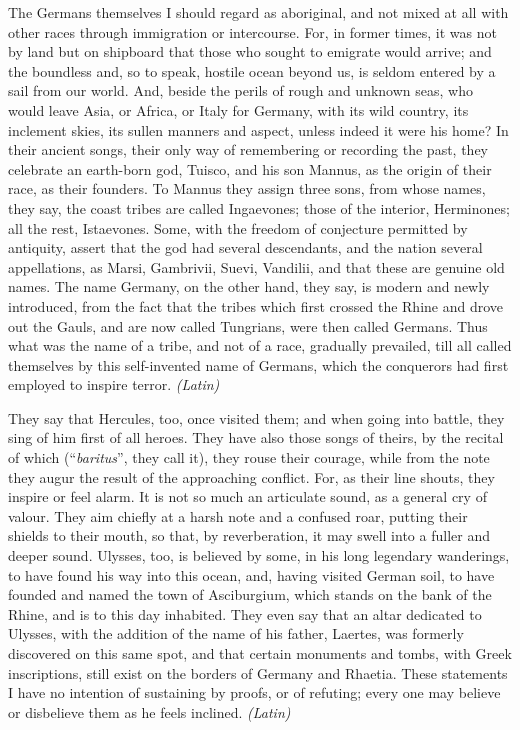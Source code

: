 The Germans themselves I should regard as aboriginal, and not mixed at all with other races through immigration or intercourse. For, in former times, it was not by land but on shipboard that those who sought to emigrate would arrive; and the boundless and, so to speak, hostile ocean beyond us, is seldom entered by a sail from our world. And, beside the perils of rough and unknown seas, who would leave Asia, or Africa, or Italy for Germany, with its wild country, its inclement skies, its sullen manners and aspect, unless indeed it were his home? In their ancient songs, their only way of remembering or recording the past, they celebrate an earth-born god, Tuisco, and his son Mannus, as the origin of their race, as their founders. To Mannus they assign three sons, from whose names, they say, the coast tribes are called Ingaevones; those of the interior, Herminones; all the rest, Istaevones. Some, with the freedom of conjecture permitted by antiquity, assert that the god had several descendants, and the nation several appellations, as Marsi, Gambrivii, Suevi, Vandilii, and that these are genuine old names. The name Germany, on the other hand, they say, is modern and newly introduced, from the fact that the tribes which first crossed the Rhine and drove out the Gauls, and are now called Tungrians, were then called Germans. Thus what was the name of a tribe, and not of a race, gradually prevailed, till all called themselves by this self-invented name of Germans, which the conquerors had first employed to inspire terror. \emph{(Latin)}


They say that Hercules, too, once visited them; and when going into battle, they sing of him first of all heroes. They have also those songs of theirs, by the recital of which (``\emph{baritus}'', they call it), they rouse their courage, while from the note they augur the result of the approaching conflict. For, as their line shouts, they inspire or feel alarm. It is not so much an articulate sound, as a general cry of valour. They aim chiefly at a harsh note and a confused roar, putting their shields to their mouth, so that, by reverberation, it may swell into a fuller and deeper sound. Ulysses, too, is believed by some, in his long legendary wanderings, to have found his way into this ocean, and, having visited German soil, to have founded and named the town of Asciburgium, which stands on the bank of the Rhine, and is to this day inhabited. They even say that an altar dedicated to Ulysses, with the addition of the name of his father, Laertes, was formerly discovered on this same spot, and that certain monuments and tombs, with Greek inscriptions, still exist on the borders of Germany and Rhaetia. These statements I have no intention of sustaining by proofs, or of refuting; every one may believe or disbelieve them as he feels inclined. \emph{(Latin)}


